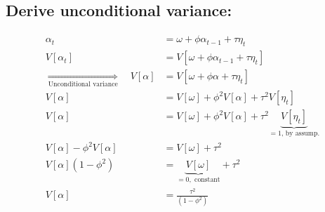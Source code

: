 \documentclass{article}
\begin{document}
\subsection{Derive unconditional variance:}

\begin{align*}
\alpha_{t} & =\omega+\phi\alpha_{t-1}+\tau\eta_{t}\\
V\left[\alpha_{t}\right] & =V\left[\omega+\phi\alpha_{t-1}+\tau\eta_{t}\right]\\
\underset{\text{Unconditional variance}}{\Longrightarrow}\quad V\left[\alpha\right] & =V\left[\omega+\phi\alpha+\tau\eta_{t}\right]\\
V\left[\alpha\right] & =V\left[\omega\right]+\phi^{2}V\left[\alpha\right]+\tau^{2}V\left[\eta_{t}\right]\\
V\left[\alpha\right] & =V\left[\omega\right]+\phi^{2}V\left[\alpha\right]+\tau^{2}\underbrace{V\left[\eta_{t}\right]}_{=1\text{, by assump.}}\\
V\left[\alpha\right]-\phi^{2}V\left[\alpha\right] & =V\left[\omega\right]+\tau^{2}\\
V\left[\alpha\right]\left(1-\phi^{2}\right) & =\underbrace{V\left[\omega\right]}_{=0,\text{ constant}}+\tau^{2}\\
V\left[\alpha\right] & =\frac{\tau^{2}}{\left(1-\phi^{2}\right)}
\end{align*}
\end{document}
